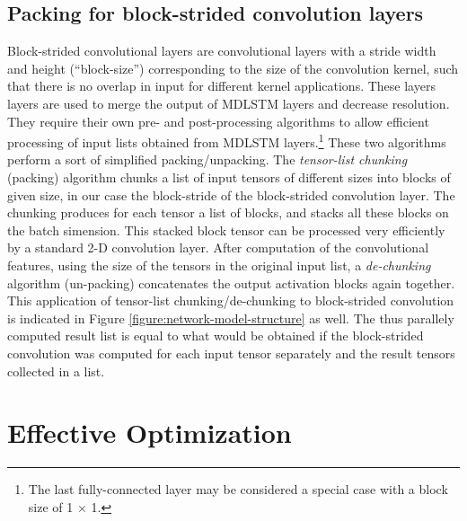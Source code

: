 \documentclass[conference]{IEEEtran}
\renewcommand{\ac}[1]{\gls{#1}}
\begin{document}
\subsection{Packing for block-strided convolution layers}
\label{subsection:packing-for-block-strided-convolution}
Block-strided convolutional layers are convolutional layers with a stride  width and height (``block-size'') corresponding to the 
size of the convolution kernel, such that there is no overlap in input for different  kernel applications. 
These layers layers are used to merge the output of \ac{MDLSTM} layers and decrease resolution. They
require their own pre- and post-processing algorithms to allow efficient processing of input lists obtained from 
\ac{MDLSTM} layers.\footnote{The last fully-connected layer may be considered a special case with a block size of 
1 $\times$ 1.} These two algorithms perform a sort of simplified packing/unpacking.
The \emph{tensor-list chunking} (packing) algorithm chunks a list of input tensors of different sizes into blocks of given size, in our case 
the block-stride of the block-strided convolution layer. The chunking produces for each tensor a list of blocks, and stacks all these blocks 
on the batch simension. This stacked block tensor can be processed very efficiently by a standard 2-D convolution layer.
After computation of the convolutional features, using the size of the tensors in the original input list, a \emph{de-chunking}
algorithm (un-packing) concatenates the output activation blocks again together. 
This application of tensor-list chunking/de-chunking to block-strided convolution is indicated in Figure \ref{figure:network-model-structure} as well. The thus parallely computed result list is equal to what would be 
obtained if the block-strided convolution was computed for each input tensor separately and the result tensors collected in a list.


\section{Effective Optimization} 
\end{document}

